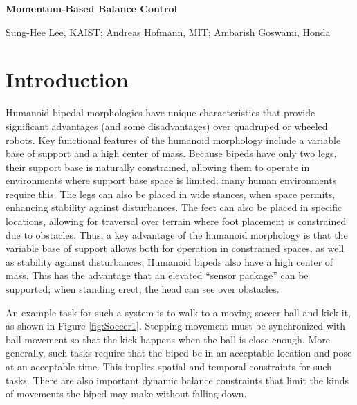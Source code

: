 \documentclass{llncs}
\def\title#1{{\noindent\Large{\bf #1}\par}}
\def\author#1{\begin{center}{\sc #1\par}\end{center}}
\begin{document}
\pagestyle{empty}

\title{Momentum-Based Balance Control}
\author{Sung-Hee Lee, KAIST; Andreas Hofmann, MIT; Ambarish Goswami, Honda}

\section{Introduction}



Humanoid bipedal morphologies have unique characteristics that provide significant advantages (and some disadvantages) over quadruped or wheeled robots. 
Key functional features of the humanoid morphology include a variable base of support and a high center of mass.
Because bipeds have only two legs, their support base is naturally constrained, allowing them to operate in environments where support base space is limited; 
many human environments require this. 
The legs can also be placed in wide stances, when space permits, enhancing stability against disturbances.
The feet can also be placed in specific locations, allowing for traversal over terrain where foot placement is constrained due to obstacles.
Thus, a key advantage of the humanoid morphology is that the variable base of support allows both for operation in constrained spaces, 
as well as stability against disturbances, 
Humanoid bipeds also have a high center of mass.  
This has the advantage that an elevated ``sensor package'' can be supported; when standing erect, the head can see over obstacles. 

An example task for such a system is to walk to a moving soccer ball and kick it, as shown in Figure \ref{fig:Soccer1}.  
Stepping movement must be synchronized with ball movement so that the kick happens when the ball is close enough.  
More generally, such tasks require that the biped be in an acceptable location and pose at an acceptable time.  
This implies spatial and temporal constraints for such tasks.  
There are also important dynamic balance constraints that limit the kinds of movements the biped may make without falling down.
\end{document}
